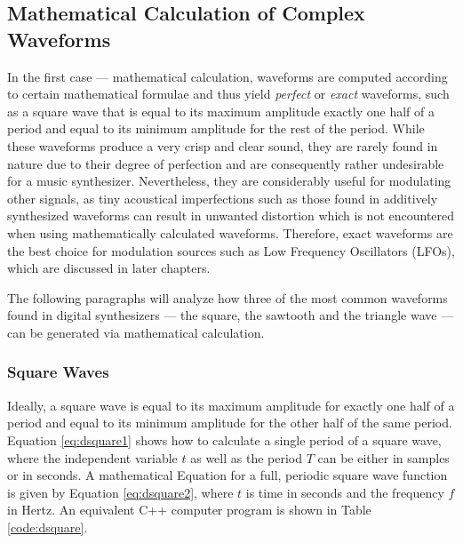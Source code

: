 \subsection{Mathematical Calculation of Complex Waveforms}

In the first case --- mathematical calculation, waveforms are computed according to certain mathematical formulae and thus yield \emph{perfect} or \emph{exact} waveforms, such as a square wave that is equal to its maximum amplitude exactly one half of a period and equal to its minimum amplitude for the rest of the period. While these waveforms produce a very crisp and clear sound, they are rarely found in nature due to their degree of perfection and are consequently rather undesirable for a music synthesizer. Nevertheless, they are considerably useful for modulating other signals, as tiny acoustical imperfections such as those found in additively synthesized waveforms can result in unwanted distortion which is not encountered when using mathematically calculated waveforms. Therefore, exact waveforms are the best choice for modulation sources such as Low Frequency Oscillators (LFOs), which are discussed in later chapters. 


The following paragraphs will analyze how three of the most common waveforms found in digital synthesizers --- the square, the sawtooth and the triangle wave --- can be generated via mathematical calculation.

\subsubsection{Square Waves}

Ideally, a square wave is equal to its maximum amplitude for exactly one half of a period and equal to its minimum amplitude for the other half of the same period. Equation \ref{eq:dsquare1} shows how to calculate a single period of a square wave, where the independent variable $t$ as well as the period $T$ can be either in samples or in seconds. A mathematical Equation for a full, periodic square wave function is given by Equation \ref{eq:dsquare2}, where $t$ is time in seconds and the frequency $f$ in Hertz. An equivalent C++ computer program is shown in Table \ref{code:dsquare}.

